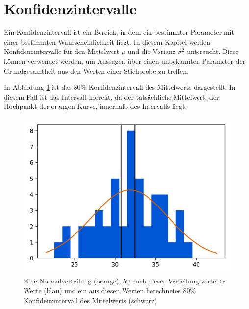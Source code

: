 \documentclass[10pt,twocolumn]{scrartcl}
\begin{document}
\section{Konfidenzintervalle}
		Ein Konfidenzintervall ist ein Bereich, in dem ein bestimmter Parameter mit einer bestimmten Wahrscheinlichkeit liegt. In diesem Kapitel werden Konfidenzintervalle für den Mittelwert $\mu$ und die Varianz $\sigma^2$ untersucht. Diese können verwendet werden, um Aussagen über einen unbekannten Parameter der Grundgesamtheit aus den Werten einer Stichprobe zu treffen.

		In Abbildung \ref{fig_mean_interval_hist} ist das $80\%$-Konfidenzintervall des Mittelwerts dargestellt. In diesem Fall ist das Intervall korrekt, da der tatsächliche Mittelwert, der Hochpunkt der orangen Kurve, innerhalb des Intervalls liegt.
		\begin{figure}[h]%
			\centering
			\includegraphics[width=0.9\columnwidth]{images/histogram_50_interval_1.png}
			\caption{Eine Normalverteilung (orange), $50$ nach dieser Verteilung verteilte Werte (blau) und ein aus diesen Werten berechnetes $80\%$ Konfidenzintervall des Mittelwerts (schwarz)}
			\label{fig_mean_interval_hist}
		\end{figure}
\end{document}
